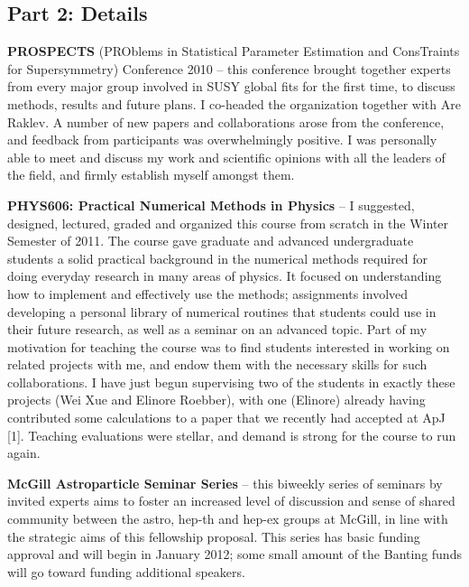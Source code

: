 \documentclass[10pt,oneside,twocolumn,a4paper]{article}
\begin{document}
\subsection*{Part 2: Details}

\textbf{PROSPECTS} (PROblems in Statistical Parameter Estimation and ConsTraints for Supersymmetry) Conference 2010 -- this conference brought together experts from every major group involved in SUSY global fits for the first time, to discuss methods, results and future plans.  I co-headed the organization together with Are Raklev.  A number of new papers and collaborations arose from the conference, and feedback from participants was overwhelmingly positive. I was personally able to meet and discuss my work and scientific opinions with all the leaders of the field, and firmly establish myself amongst them.

\textbf{PHYS606: Practical Numerical Methods in Physics} -- I suggested, designed, lectured, graded and organized this course from scratch in the Winter Semester of 2011.  The course gave graduate and advanced undergraduate students a solid practical background in the numerical methods required for doing everyday research in many areas of physics.  It focused on understanding how to implement and effectively use the methods; assignments involved developing a personal library of numerical routines that students could use in their future research, as well as a seminar on an advanced topic.  Part of my motivation for teaching the course was to find students interested in working on related projects with me, and endow them with the necessary skills for such collaborations.  I have just begun supervising two of the students in exactly these projects (Wei Xue and Elinore Roebber), with one (Elinore) already having contributed some calculations to a paper that we recently had accepted at ApJ [1].  Teaching evaluations were stellar, and demand is strong for the course to run again.

\textbf{McGill Astroparticle Seminar Series} -- this biweekly series of seminars by invited experts aims to foster an increased level of discussion and sense of shared community between the astro, hep-th and hep-ex groups at McGill, in line with the strategic aims of this fellowship proposal.  This series has basic funding approval and will begin in January 2012; some small amount of the Banting funds will go toward funding additional speakers.
\end{document}
